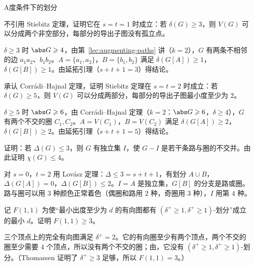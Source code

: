 \begin{exercises}{A}{度条件下的划分}
\item\label{ex:partitions:A1} 不引用 Stiebitz 定理，证明它在 $s=t=1$ 时成立：若 $\delta(G)\geqslant3$，则 $V(G)$ 可以分成两个非空部分，每部分的导出子图没有孤立点。
\begin{solution}
$\delta\geqslant3$ 时 $\abs G\geqslant4$，由第~\ref{lec:augmenting-paths} 讲（$k=2$），$G$ 有两条不相邻的边 $a_1a_2$、$b_1b_2$。$A=\{a_1,a_2\}$，$B=\{b_1,b_2\}$ 满足 $\delta(G[A])\geqslant1$，$\delta(G[B])\geqslant1$。由延拓引理（$s+t+1=3$）得结论。
\end{solution}

\item\label{ex:partitions:A2} 承认 Corrádi--Hajnal 定理，证明 Stiebitz 定理在 $s=t=2$ 时成立：若 $\delta(G)\geqslant5$，则 $V(G)$ 可以分成两部分，每部分的导出子图最小度至少为 $2$。
\begin{solution}
$\delta\geqslant5$ 时 $\abs G\geqslant6$，由 Corrádi--Hajnal 定理（$k=2$：$\abs G\geqslant6$，$\delta\geqslant4$），$G$ 有两个不交的圈 $C_1,C_2$。$A=V(C_1)$，$B=V(C_2)$ 满足 $\delta(G[A])\geqslant2$，$\delta(G[B])\geqslant2$。由延拓引理（$s+t+1=5$）得结论。
\end{solution}

\item\label{ex:partitions:A3} 证明：若 $\Delta(G)\leqslant3$，则 $G$ 有独立集 $I$，使 $G-I$ 是若干条路与圈的不交并。由此证明 $\chi(G)\leqslant4$。
\begin{solution}
对 $s=0$，$t=2$ 用 Lovász 定理：$\Delta\leqslant3=s+t+1$，有划分 $A\cup B$，$\Delta(G[A])=0$，$\Delta(G[B])\leqslant2$。$I=A$ 是独立集，$G[B]$ 的分支是路或圈。路与圈可以用 $3$ 种颜色正常着色（偶圈和路用 $2$ 种，奇圈用 $3$ 种），$I$ 用第 $4$ 种。
\end{solution}

\item\label{ex:partitions:A4} 记 $F(1,1)$ 为使“最小出度至少为 $d$ 的有向图都有 $(\delta^+\geqslant1,\delta^+\geqslant1)$-划分”成立的最小 $d$。证明 $F(1,1)\geqslant3$。
\begin{solution}
三个顶点上的完全有向图满足 $\delta^+=2$。它的有向圈至少有两个顶点，两个不交的圈至少需要 $4$ 个顶点，所以没有两个不交的圈；由，它没有 $(\delta^+\geqslant1,\delta^+\geqslant1)$-划分。（Thomassen 证明了 $\delta^+\geqslant3$ 足够，所以 $F(1,1)=3$。）
\end{solution}
\end{exercises}
